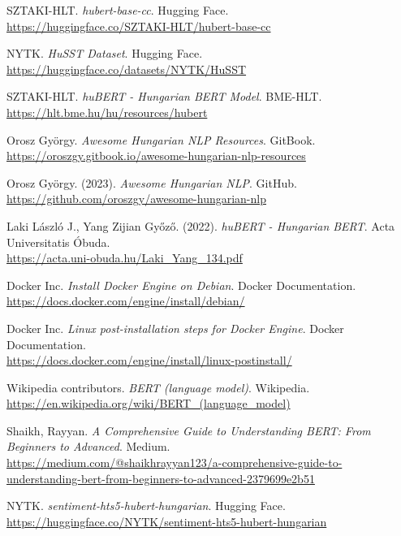 \documentclass[12pt]{article}
\begin{document}
\begin{thebibliography}{99}

SZTAKI-HLT. \textit{hubert-base-cc}. Hugging Face. \\
\url{https://huggingface.co/SZTAKI-HLT/hubert-base-cc}

NYTK. \textit{HuSST Dataset}. Hugging Face. \\
\url{https://huggingface.co/datasets/NYTK/HuSST}

SZTAKI-HLT. \textit{huBERT - Hungarian BERT Model}. BME-HLT. \\
\url{https://hlt.bme.hu/hu/resources/hubert}

Orosz György. \textit{Awesome Hungarian NLP Resources}. GitBook. \\
\url{https://oroszgy.gitbook.io/awesome-hungarian-nlp-resources}

Orosz György. (2023). \textit{Awesome Hungarian NLP}. GitHub. \\
\url{https://github.com/oroszgy/awesome-hungarian-nlp}

Laki László J., Yang Zijian Győző. (2022). \textit{huBERT - Hungarian BERT}. Acta Universitatis Óbuda. \\
\url{https://acta.uni-obuda.hu/Laki_Yang_134.pdf}

Docker Inc. \textit{Install Docker Engine on Debian}. Docker Documentation. \\
\url{https://docs.docker.com/engine/install/debian/}

Docker Inc. \textit{Linux post-installation steps for Docker Engine}. Docker Documentation. \\
\url{https://docs.docker.com/engine/install/linux-postinstall/}

Wikipedia contributors. \textit{BERT (language model)}. Wikipedia. \\
\url{https://en.wikipedia.org/wiki/BERT_(language_model)}

Shaikh, Rayyan. \textit{A Comprehensive Guide to Understanding BERT: From Beginners to Advanced}. Medium. \\
\url{https://medium.com/@shaikhrayyan123/a-comprehensive-guide-to-understanding-bert-from-beginners-to-advanced-2379699e2b51}

NYTK. \textit{sentiment-hts5-hubert-hungarian}. Hugging Face. \\
\url{https://huggingface.co/NYTK/sentiment-hts5-hubert-hungarian}

\end{thebibliography}
\end{document}
